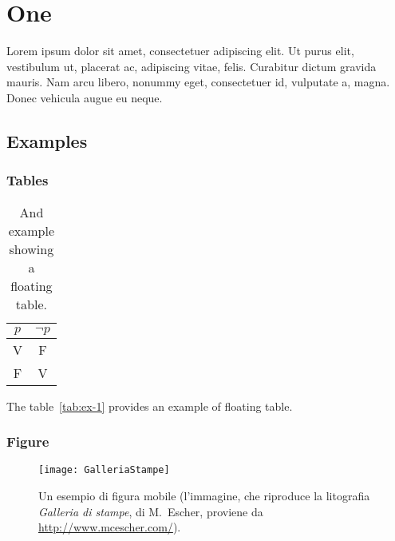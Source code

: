 
\chapter{One}
\label{cap:one}

Lorem ipsum dolor sit amet, consectetuer adipiscing elit. Ut purus elit, vestibulum ut, placerat ac, adipiscing vitae, felis. Curabitur dictum gravida mauris. Nam arcu libero, nonummy eget, consectetuer id, vulputate a, magna. Donec vehicula augue eu neque.

\section{Examples}

\subsection{Tables}

\lipsum

\begin{table}[tb]
\caption[A floating table]{And example showing a floating table.}
\label{tab:ex-1}
\centering
\begin{tabular}{cc}
\toprule
$p$ & $\lnot p$ \\ 
\midrule
V   & F \\ 
F   & V \\
\bottomrule 
\end{tabular}
\end{table}

The table~\vref{tab:ex-1} provides an example of floating table.

\lipsum[1-2]


\subsection{Figure}

\lipsum[2]

\begin{figure}[tb] 
\centering 
\texttt{[image: GalleriaStampe]} 
\caption[Un esempio di figura mobile]{Un esempio di figura mobile (l'immagine, che riproduce la litografia \emph{Galleria di stampe}, di M.~Escher, proviene da \url{http://www.mcescher.com/}).}
\label{fig:galleria} 
\end{figure}


